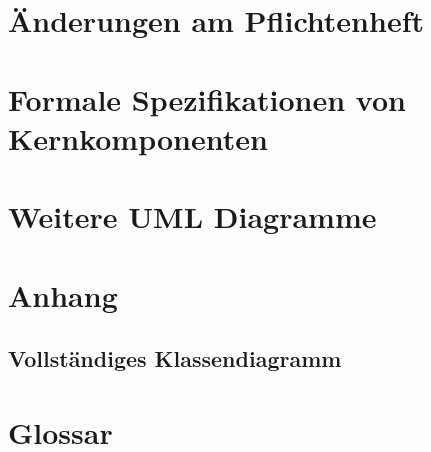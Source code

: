 \documentclass[parskip=full]{scrartcl}
\begin{document}
\clearpage
\section{Änderungen am Pflichtenheft}


\clearpage
\section{Formale Spezifikationen von Kernkomponenten}

\clearpage
\section{Weitere UML Diagramme}


\clearpage
\section{Anhang}


\clearpage
\subsection{Vollständiges Klassendiagramm}


\clearpage
\section{Glossar}\label{glossar}

\renewcommand*{\glossarysection}[2][]{}	%
\printnoidxglossaries				%
\end{document}
